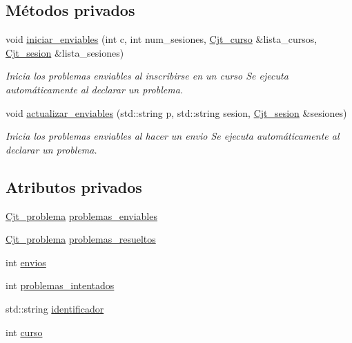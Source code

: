 \subsection*{Métodos privados}
\begin{DoxyCompactItemize}
\item 
void \mbox{\hyperlink{class_usuario_a0b4c3ba568ee299aed56005ce6e6a72f}{iniciar\+\_\+enviables}} (int c, int num\+\_\+sesiones, \mbox{\hyperlink{class_cjt__curso}{Cjt\+\_\+curso}} \&lista\+\_\+cursos, \mbox{\hyperlink{class_cjt__sesion}{Cjt\+\_\+sesion}} \&lista\+\_\+sesiones)
\begin{DoxyCompactList}\small\item\em Inicia los problemas enviables al inscribirse en un curso Se ejecuta automáticamente al declarar un problema. \end{DoxyCompactList}\item 
void \mbox{\hyperlink{class_usuario_a4dbe4aafe7c5308293ef5f6094f35bb1}{actualizar\+\_\+enviables}} (std\+::string p, std\+::string sesion, \mbox{\hyperlink{class_cjt__sesion}{Cjt\+\_\+sesion}} \&sesiones)
\begin{DoxyCompactList}\small\item\em Inicia los problemas enviables al hacer un envio Se ejecuta automáticamente al declarar un problema. \end{DoxyCompactList}\end{DoxyCompactItemize}
\subsection*{Atributos privados}
\begin{DoxyCompactItemize}
\item 
\mbox{\hyperlink{class_cjt__problema}{Cjt\+\_\+problema}} \mbox{\hyperlink{class_usuario_a553cef1aad192b30d010cd524f261c1b}{problemas\+\_\+enviables}}
\item 
\mbox{\hyperlink{class_cjt__problema}{Cjt\+\_\+problema}} \mbox{\hyperlink{class_usuario_a53fa260ffc780dd5c3a4805d683e5ee7}{problemas\+\_\+resueltos}}
\item 
int \mbox{\hyperlink{class_usuario_a485a741c0646e6414bd6cf669a77fc9c}{envios}}
\item 
int \mbox{\hyperlink{class_usuario_a5484a08ce9aeabef98074c738f58b00a}{problemas\+\_\+intentados}}
\item 
std\+::string \mbox{\hyperlink{class_usuario_a95926ccb5e92ec5f2acab98830a3725e}{identificador}}
\item 
int \mbox{\hyperlink{class_usuario_aa767fe2d1198f2c97791073bc55803e7}{curso}}
\end{DoxyCompactItemize}


